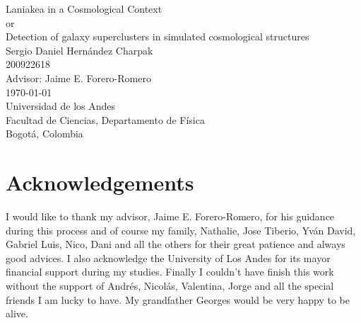 \documentclass[12pt]{article}
\begin{document}
\begin{center}
\begin{figure}
\centering%
%
\end{figure}
\vspace{3 cm}
\FloatBarrier
\Huge
Laniakea in a Cosmological Context\\
\vspace{3 mm}
or\\
\vspace{3 mm}
Detection of galaxy superclusters in simulated cosmological structures\\  
\vspace{1 cm}
\vspace{3mm}
\Large Sergio Daniel Hern\'{a}ndez Charpak\\

\large
200922618\\
\vspace{1 cm}
\vspace{2mm}
\Large
Advisor: Jaime E. Forero-Romero\\

\normalsize
\vspace{2mm}
\vspace{1 cm}
\today \\
\vspace{1 cm}
\small 
Universidad de los Andes\\
Facultad de Ciencias, Departamento de F\'{i}sica\\
Bogot\'{a}, Colombia\\
\end{center}


\normalsize
\newpage
\section{Acknowledgements}

I would like to thank my advisor, Jaime E. Forero-Romero, for his guidance
 during this process and of course my family,
  Nathalie, Jose Tiberio, Yv\'{a}n David,
  Gabriel Luis, Nico, Dani and all the others for
   their great patience and always good advices. I
    also acknowledge the University of Los Andes
     for its mayor financial support during my
      studies. Finally I couldn't have finish this
       work without the support of Andr\'{e}s,
        Nicol\'{a}s, Valentina, Jorge and all the special
         friends I am lucky to have. My grandfather Georges
          would
          be very happy to be alive.
\end{document}
